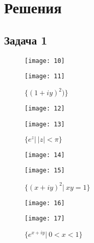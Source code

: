 
\newpage
\section*{Решения}
\subsection*{Задача 1}
	\begin{figure}[!h]
		\begin{minipage}[h]{0.49\linewidth}
			\center\texttt{[image: 10]}
			\caption{$\{z^2|\ |z-1| = 1\}$}
		\end{minipage}
		\begin{minipage}[h]{0.49\linewidth}
			\center\texttt{[image: 11]}
			\caption{$\{(1+iy)^2)\}$}
		\end{minipage}
	\end{figure}

	\begin{figure}[!h]
		\begin{minipage}[h]{0.49\linewidth}
			\center\texttt{[image: 12]}
			\caption{$\{z+1/z|\ |z| = 2\}$}
		\end{minipage}
		\begin{minipage}[h]{0.49\linewidth}
			\center\texttt{[image: 13]}
			\caption{$\{e^z|\ |z| < \pi\}$}
		\end{minipage}
	\end{figure}

	\begin{figure}[!h]
		\begin{minipage}[h]{0.49\linewidth}
			\center\texttt{[image: 14]}
			\caption{$\{(x+iy)^2|\ y = x+1\}$}
		\end{minipage}
		\begin{minipage}[h]{0.49\linewidth}
			\center\texttt{[image: 15]}
			\caption{$\{(x+iy)^2|\ xy=1\}$}
		\end{minipage}
	\end{figure}

	\begin{figure}[!h]
		\begin{minipage}[h]{0.49\linewidth}
			\center\texttt{[image: 16]}
			\caption{$\{(x+iy)^2|\ y^2 = x^2 - 1, x>0\}$}
		\end{minipage}
		\begin{minipage}[h]{0.49\linewidth}
			\center\texttt{[image: 17]}
			\caption{$\{e^{x+iy}|\ 0<x<1\}$}
		\end{minipage}
	\end{figure}

